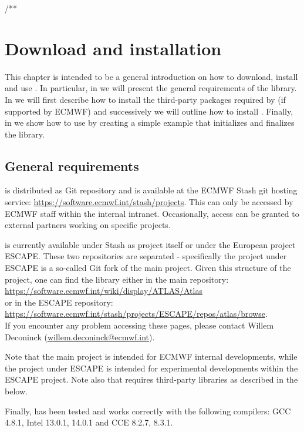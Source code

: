 /**
\chapter{Download and installation}
\label{chap:installation}
This chapter is intended to be a general introduction 
on how to download, install and use \Atlas. In particular, 
in  we will present the general 
requirements of the library. In  we 
will first describe how to install the third-party packages 
required by \Atlas (if supported by ECMWF) and successively 
we will outline how to install \Atlas. Finally, in 
we show how to use \Atlas by creating a simple example 
that initializes and finalizes the library.


\section{General requirements}
\label{s:requirements}

\Atlas is distributed as Git repository and is available at the ECMWF Stash 
git hosting service: \url{https://software.ecmwf.int/stash/projects}.
This can only be accessed by ECMWF staff within the internal intranet.
Occasionally, access can be granted to external partners working 
on specific projects.

\Atlas is currently available under Stash as \Atlas project 
itself or under the European project ESCAPE. These two repositories 
are separated - specifically the \Atlas project under ESCAPE is 
a so-called Git fork of the main \Atlas project.
Given this structure of the \Atlas project, one can find the 
library either in the main repository:\\
\url{https://software.ecmwf.int/wiki/display/ATLAS/Atlas}\\
or in the ESCAPE repository:\\
\url{https://software.ecmwf.int/stash/projects/ESCAPE/repos/atlas/browse}.\\
If you encounter any problem accessing these pages, please contact 
Willem Deconinck (\url{willem.deconinck@ecmwf.int}).

Note that the main \Atlas project is intended for ECMWF internal 
developments, while the \Atlas project under ESCAPE is intended 
for experimental developments within the ESCAPE project.
Note also that \Atlas requires third-party libraries as described 
in the  below.

Finally, \Atlas has been tested and works correctly with the 
following compilers: GCC 4.8.1, Intel 13.0.1, 14.0.1 and CCE 
8.2.7, 8.3.1.


